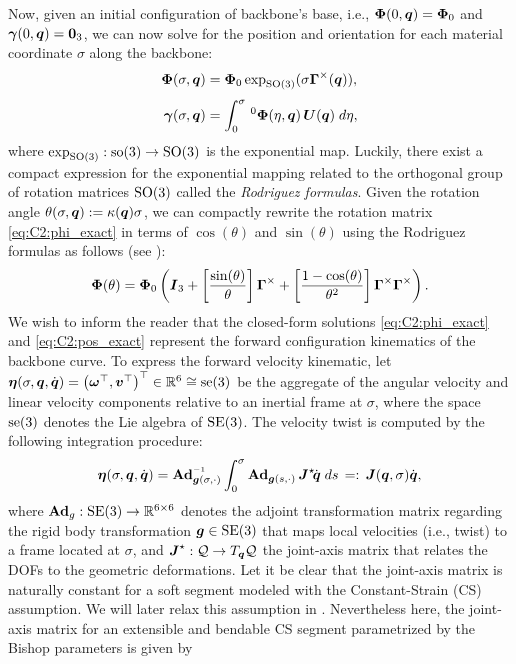 Now, given an initial configuration of backbone's base, i.e.,
$\boldsymbol{\Phi}(0,\boldsymbol{q}) = \boldsymbol{\Phi}_0$ and $ {\boldsymbol{\gamma}}(0,{\boldsymbol{q}}) = \boldsymbol{0}_3$, we can now solve for the position and orientation for each material coordinate $\sigma$ along the backbone:
%
\begin{align}
\boldsymbol{\Phi}(\sigma,\boldsymbol{q}) & = \boldsymbol{\Phi}_0\exp_{\textup{\textrm{SO}}(3)}(\sigma \boldsymbol{\Gamma}^\times(\boldsymbol{q})), \label{eq:C2:phi_exact} \\[0.35em]
{\boldsymbol{\gamma}}(\sigma,\boldsymbol{q}) & = \int_0^\sigma\,^0\boldsymbol{\Phi}(\eta,\boldsymbol{q})\, \boldsymbol{U}(\boldsymbol{q}) \; d\eta,
\label{eq:C2:pos_exact}
\end{align}
%
where $\exp_{\textup{\textrm{SO}}(3)}: \textup{\textrm{so}}(3) \to \textup{\textrm{SO}}(3)$ is the exponential map. Luckily, there exist a compact expression for the exponential mapping related to the orthogonal group of rotation matrices $\textup{\textrm{SO}}(3)$ called the \emph{Rodriguez formulas}. Given the rotation angle $\theta(\sigma,{\boldsymbol{q}}) := \kappa({\boldsymbol{q}}) \sigma$, we can compactly rewrite the rotation matrix \eqref{eq:C2:phi_exact} in terms of $\cos(\theta)$ and $\sin(\theta)$ using the Rodriguez formulas as follows (see \cite{Lynch2017}):
%
\begin{equation}
{\boldsymbol{\Phi}}(\theta) = {\boldsymbol{\Phi}}_0 \left( \boldsymbol{I}_3 + \left[ \frac{\sin(\theta)}{\theta} \right]  {\boldsymbol{\Gamma}}^{\times} + \left[ \frac{1-\cos(\theta)}{\theta^2} \right]  {\boldsymbol{\Gamma}}^{\times} {\boldsymbol{\Gamma}}^{\times} \right).
\label{eq:C2:phi_rodr}
\end{equation}
%
We wish to inform the reader that the closed-form solutions \eqref{eq:C2:phi_exact} and \eqref{eq:C2:pos_exact} represent the forward configuration kinematics of the backbone curve. To express the forward velocity kinematic, let
${\boldsymbol{\eta}}(\sigma,{\boldsymbol{q}},{\dot{\boldsymbol{q}}}) = \left( \boldsymbol{\omega}^\top, \boldsymbol{v}^\top \right)^\top \in \mathbb{R}^6 \cong \textup{\textrm{se}}(3)$
 be the aggregate of the angular velocity and linear velocity components relative to an inertial frame at $\sigma$, where the space $\textup{\textrm{se}}(3)$ denotes the Lie algebra of $\textup{\textrm{SE}}(3)$. The velocity twist is computed by the following integration procedure:
%
\begin{align}
 \etaB(\sigma,\q,\dq) = \Ad_{\mat{g}(\sigma,\cdot)}\inv \int_0^\sigma \Ad_{\mat{g}(s,\cdot)}\, \JB^\star\! \dq\;ds
 \,=:\, \JB(\q,\sigma) \dq, \label{eq:C2:vel_cont}
\end{align}
%
where $\textbf{Ad}_g: \textup{\textrm{SE}}(3) \to \mathbb{R}^{6\times 6}$ denotes the adjoint transformation matrix regarding the rigid body transformation ${\boldsymbol{g}} \in \textup{\textrm{SE}}(3)$ that maps local velocities (i.e., twist) to a frame located at $\sigma$, and ${\boldsymbol{J}}^\star:\mathcal{Q} \to T_{{\boldsymbol{q}}}\mathcal{Q}$ the joint-axis matrix that relates the DOFs to the geometric deformations. Let it be clear that the joint-axis matrix is naturally constant for a soft segment modeled with the Constant-Strain (CS) assumption. We will later relax this assumption in . Nevertheless here, the joint-axis matrix for an extensible and bendable CS segment parametrized by the Bishop parameters is given by
